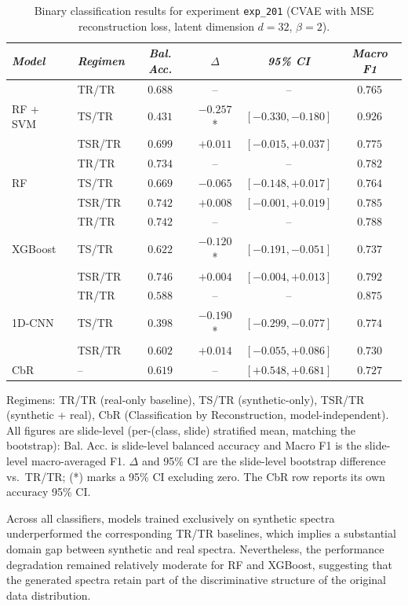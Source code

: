 \begin{table}[h] 
\caption{Binary classification results for experiment \texttt{exp\_201} (CVAE with MSE reconstruction loss, latent dimension $d=32$, $\beta=2$).}
\label{tab:binary_results}
\small
\begin{tabular*}{\textwidth}{@{\extracolsep{\fill}}llcccc}
\toprule
\emph{Model} & \emph{Regimen} & \emph{Bal. Acc.} & \emph{$\Delta$} & \emph{95\% CI} & \emph{Macro F1}\\
\midrule
\multirow{3}{*}{RF + SVM} & TR/TR & $0.688$ & -- & -- & $0.765$ \\
 & TS/TR & $0.431$ & $-0.257$* & $[-0.330, -0.180]$ & $0.926$ \\
 & TSR/TR & $0.699$ & $+0.011$ & $[-0.015, +0.037]$ & $0.775$ \\
\midrule
\multirow{3}{*}{RF} & TR/TR & $0.734$ & -- & -- & $0.782$ \\
 & TS/TR & $0.669$ & $-0.065$ & $[-0.148, +0.017]$ & $0.764$ \\
 & TSR/TR & $0.742$ & $+0.008$ & $[-0.001, +0.019]$ & $0.785$ \\
\midrule
\multirow{3}{*}{XGBoost} & TR/TR & $0.742$ & -- & -- & $0.788$ \\
 & TS/TR & $0.622$ & $-0.120$* & $[-0.191, -0.051]$ & $0.737$ \\
 & TSR/TR & $0.746$ & $+0.004$ & $[-0.004, +0.013]$ & $0.792$ \\
\midrule
\multirow{3}{*}{1D-CNN} & TR/TR & $0.588$ & -- & -- & $0.875$ \\
 & TS/TR & $0.398$ & $-0.190$* & $[-0.299, -0.077]$ & $0.774$ \\
 & TSR/TR & $0.602$ & $+0.014$ & $[-0.055, +0.086]$ & $0.730$ \\
\midrule
CbR & -- & $0.619$ & -- & $[+0.548, +0.681]$ & $0.727$ \\
\bottomrule
\end{tabular*}
\small{Regimens: TR/TR (real-only baseline), TS/TR (synthetic-only), TSR/TR (synthetic + real), CbR (Classification by Reconstruction, model-independent). All figures are slide-level (per-(class, slide) stratified mean, matching the bootstrap): Bal. Acc. is slide-level balanced accuracy and Macro F1 is the slide-level macro-averaged F1. $\Delta$ and 95\% CI are the slide-level bootstrap difference vs.\ TR/TR; (*) marks a 95\% CI excluding zero. The CbR row reports its own accuracy 95\% CI.}
\end{table}

Across all classifiers, models trained exclusively on synthetic spectra underperformed the corresponding TR/TR baselines, which implies a substantial domain gap between synthetic and real spectra. Nevertheless, the performance degradation remained relatively moderate for RF and XGBoost, suggesting that the generated spectra retain part of the discriminative structure of the original data distribution.

